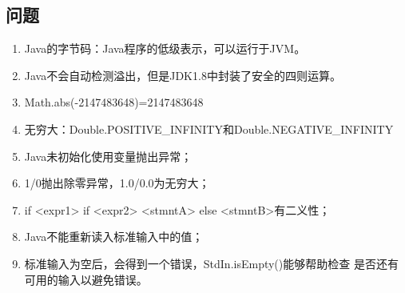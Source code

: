 \subsection{问题}
\begin{enumerate}
	\item Java的字节码：Java程序的低级表示，可以运行于JVM。
	\item Java不会自动检测溢出，但是JDK1.8中封装了安全的四则运算。
	\item Math.abs(-2147483648)=2147483648
	\item 无穷大：Double.POSITIVE\_INFINITY和Double.NEGATIVE\_INFINITY
	\item Java未初始化使用变量抛出异常；
	\item 1/0抛出除零异常，1.0/0.0为无穷大；
	\item if <expr1> if <expr2> <stmntA> else <stmntB>有二义性；
	\item Java不能重新读入标准输入中的值；
	\item 标准输入为空后，会得到一个错误，StdIn.isEmpty()能够帮助检查
	是否还有可用的输入以避免错误。
\end{enumerate}
